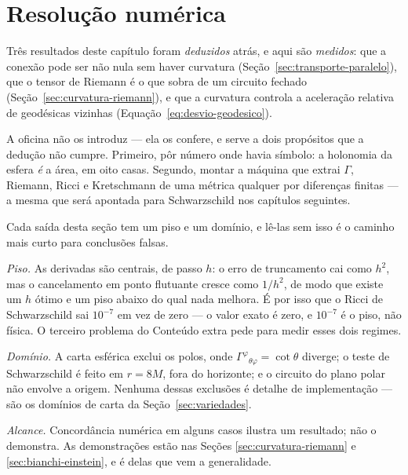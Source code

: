 \section{Resolução numérica}
\label{sec:cap06-numerica}

Três resultados deste capítulo foram \emph{deduzidos} atrás, e aqui são
\emph{medidos}: que a conexão pode ser não nula sem haver curvatura
(Seção~\ref{sec:transporte-paralelo}), que o tensor de Riemann é o que sobra
de um circuito fechado (Seção~\ref{sec:curvatura-riemann}), e que a curvatura
controla a aceleração relativa de geodésicas vizinhas
(Equação~\eqref{eq:desvio-geodesico}).

A oficina não os introduz --- ela os confere, e serve a dois propósitos que a
dedução não cumpre. Primeiro, pôr número onde havia símbolo: a holonomia da
esfera \emph{é} a área, em oito casas. Segundo, montar a máquina que extrai
$\Gamma$, Riemann, Ricci e Kretschmann de uma métrica qualquer por diferenças
finitas --- a mesma que será apontada para Schwarzschild nos capítulos
seguintes.

\begin{atencao}[title={\sffamily\bfseries\footnotesize\color{rgTerracota}O QUE UM TESTE NUMÉRICO MOSTRA, E O QUE NÃO}]
Cada saída desta seção tem um piso e um domínio, e lê-las sem isso é o
caminho mais curto para conclusões falsas.

\emph{Piso.} As derivadas são centrais, de passo $h$: o erro de truncamento
cai como $h^2$, mas o cancelamento em ponto flutuante cresce como $1/h^2$, de
modo que existe um $h$ ótimo e um piso abaixo do qual nada melhora. É por isso
que o Ricci de Schwarzschild sai $10^{-7}$ em vez de zero --- o valor exato é
zero, e $10^{-7}$ é o piso, não física. O terceiro problema do Conteúdo extra
pede para medir esses dois regimes.

\emph{Domínio.} A carta esférica exclui os polos, onde
$\Gamma^\varphi{}_{\theta\varphi}=\cot\theta$ diverge; o teste de
Schwarzschild é feito em $r=8M$, fora do horizonte; e o circuito do plano
polar não envolve a origem. Nenhuma dessas exclusões é detalhe de
implementação --- são os domínios de carta da
Seção~\ref{sec:variedades}.

\emph{Alcance.} Concordância numérica em alguns casos ilustra um resultado;
não o demonstra. As demonstrações estão nas Seções
\ref{sec:curvatura-riemann} e \ref{sec:bianchi-einstein}, e é delas que vem a
generalidade.
\end{atencao}


